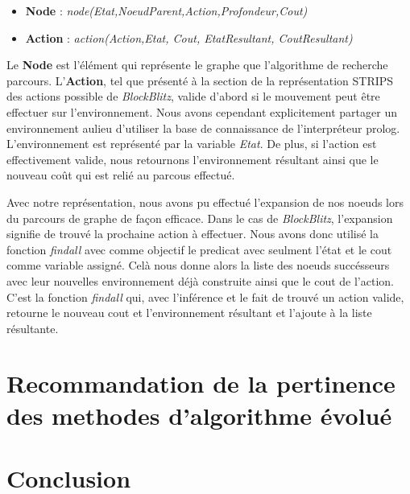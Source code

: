 \documentclass[12pt,english,frenchb,letterpaper]{article}
\begin{document}
\begin{itemize}
\item \textbf{Node} : \textit{node(Etat,NoeudParent,Action,Profondeur,Cout)}
\item \textbf{Action} : \textit{action(Action,Etat, Cout, EtatResultant, CoutResultant)}
\end{itemize}

Le \textbf{Node} est l'élément qui représente le graphe que l'algorithme de recherche parcours. L'\textbf{Action}, tel que présenté à la section de la représentation STRIPS des actions possible de \textit{BlockBlitz}, valide d'abord si le mouvement peut être effectuer sur l'environnement. Nous avons cependant explicitement partager un environnement aulieu d'utiliser la base de connaissance de l'interpréteur prolog. L'environnement est représenté par la variable \textit{Etat}. De plus, si l'action est effectivement valide, nous retournons l'environnement résultant ainsi que le nouveau coût qui est relié au parcous effectué.

Avec notre représentation, nous avons pu effectué l'expansion de nos noeuds lors du parcours de graphe de façon efficace. Dans le cas de \textit{BlockBlitz}, l'expansion signifie de trouvé la prochaine action à effectuer. Nous avons donc utilisé la fonction \textit{findall} avec comme objectif le predicat avec seulment l'état et le cout comme variable assigné. Celà nous donne alors la liste des noeuds succésseurs avec leur nouvelles environnement déjà construite ainsi que le cout de l'action. C'est la fonction \textit{findall} qui, avec l'inférence et le fait de trouvé un action valide, retourne le nouveau cout et l'environnement résultant et l'ajoute à la liste résultante.


\section{Recommandation de la pertinence des methodes d'algorithme évolué}

\section{Conclusion}
\end{document}
